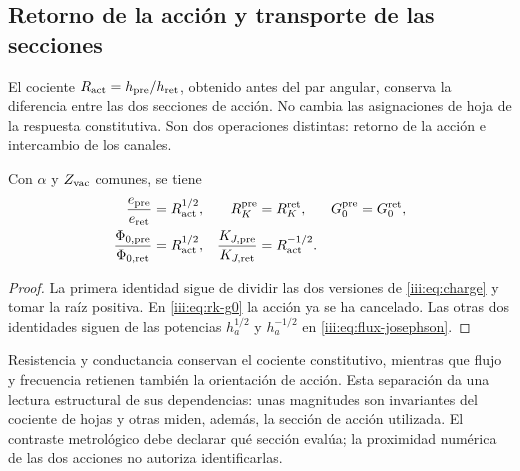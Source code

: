 \subsection{Retorno de la acción y transporte de las secciones}

El cociente $R_{\rm act}=h_{\rm pre}/h_{\rm ret}$, obtenido antes del
par angular, conserva la diferencia entre las dos secciones de acción.
No cambia las asignaciones de hoja de la respuesta constitutiva. Son dos
operaciones distintas: retorno de la acción e intercambio de los canales.

\begin{proposition}
Con $\alpha$ y $Z_{\rm vac}$ comunes, se tiene
\begin{align}
 \frac{e_{\rm pre}}{e_{\rm ret}}&=R_{\rm act}^{1/2},
 &R_K^{\rm pre}&=R_K^{\rm ret},
 &G_0^{\rm pre}&=G_0^{\rm ret},\label{iii:eq:charge-return}\\
 \frac{\Phi_{0,\rm pre}}{\Phi_{0,\rm ret}}&=R_{\rm act}^{1/2},
 &\frac{K_{J,\rm pre}}{K_{J,\rm ret}}&=R_{\rm act}^{-1/2}.
 \label{iii:eq:flux-return}
\end{align}
\end{proposition}
\begin{proof}
La primera identidad sigue de dividir las dos versiones de
\eqref{iii:eq:charge} y tomar la raíz positiva. En
\eqref{iii:eq:rk-g0} la acción ya se ha cancelado. Las otras dos
identidades siguen de las potencias $h_a^{1/2}$ y $h_a^{-1/2}$ en
\eqref{iii:eq:flux-josephson}.
\end{proof}

Resistencia y conductancia conservan el cociente constitutivo, mientras
que flujo y frecuencia retienen también la orientación de acción. Esta
separación da una lectura estructural de sus dependencias: unas magnitudes
son invariantes del cociente de hojas y otras miden, además, la sección de
acción utilizada. El contraste metrológico debe declarar qué sección evalúa;
la proximidad numérica de las dos acciones no autoriza identificarlas.
